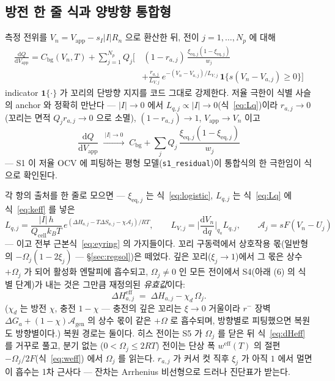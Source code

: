\documentclass[11pt,a4paper]{article}
\newcommand{\dd}{\mathrm{d}}
\newcommand{\eff}{\mathrm{eff}}
\newcommand{\eq}{\mathrm{eq}}
\newcommand{\app}{\mathrm{app}}
\newcommand{\cell}{\mathrm{cell}}
\newcommand{\bg}{\mathrm{bg}}
\begin{document}
\subsection{방전 한 줄 식과 양방향 통합형}
측정 전위를 $V_n=V_\app-s_I|I|R_n$ 으로 환산한 뒤, 전이 $j=1,\dots,N_p$ 에 대해
\begin{equation}
\boxed{\;\begin{aligned}\frac{\dd Q}{\dd V_\app}=C_\bg(V_n,T)+\sum_{j=1}^{N_p}Q_j\bigg[&\,
(1-r_{a,j})\,\frac{\xi_{\eq,j}(1-\xi_{\eq,j})}{w_j}\\[-2pt]
&+\frac{r_{a,j}}{L_{V,j}}\,e^{-(V_n-V_{a,j})/L_{V,j}}\,\mathbf 1\{s(V_n-V_{a,j})\ge0\}\bigg]\end{aligned}\;}
\label{eq:master}
\end{equation}
indicator $\mathbf 1\{\cdot\}$ 가 꼬리의 단방향 지지를 코드 그대로 강제한다. 저율 극한이 식별
사슬의 anchor 와 정확히 만난다 — $|I|\to0$ 에서 $L_{q,j}\propto|I|\to0$(식~\eqref{eq:Lq})이라
$r_{a,j}\to0$(꼬리는 면적 $Q_jr_{a,j}\to0$ 으로 소멸), $(1-r_{a,j})\to1$, $V_\app\to V_n$ 이고
\begin{equation*}
\frac{\dd Q}{\dd V_\app}\;\xrightarrow{\ |I|\to0\ }\;
C_\bg+\sum_jQ_j\,\frac{\xi_{\eq,j}(1-\xi_{\eq,j})}{w_j}
\end{equation*}
— S1 이 저율 OCV 에 피팅하는 평형 모델(\texttt{s1\_residual})이 통합식의 한 극한임이 식으로
확인된다.

각 항의 출처를 한 줄로 모으면 — $\xi_{\eq,j}$ 는 식~\eqref{eq:logistic}, $L_{q,j}$ 는
식~\eqref{eq:Lq} 에 식~\eqref{eq:keff} 를 넣은
\begin{equation*}
L_{q,j}=\frac{|I|\,h}{Q_\cell k_BT}\,
e^{(\Delta H_{a,j}-T\Delta S_{a,j}-\chi\mathcal A_j)/RT},
\qquad L_{V,j}=\Big|\frac{\dd V_n}{\dd q}\Big|_{q_a}L_{q,j},
\qquad \mathcal A_j=sF(V_n-U_j)
\end{equation*}
— 이고 전부 근본식~\eqref{eq:eyring} 의 가지들이다. 꼬리 구동력에서 상호작용 몫(일반형의 $-\Omega_j(1-2\xi_j)$ — \S\ref{sec:regsol})은 떼었다.
깊은 꼬리($\xi_j\to1$)에서 그 몫은 상수 $+\Omega_j$ 가 되어 활성화 엔탈피에 흡수되고,
$\Omega_j\ne0$ 인 모든 전이에서 S4(아래 (6) 의 식별 단계)가 내는 것은 그만큼 재정의된
\emph{유효값}이다:
\begin{equation}
\Delta H_{a,j}^{\eff}\;=\;\Delta H_{a,j}-\chi_d\,\Omega_j.
\label{eq:dHeff}
\end{equation}
($\chi_d$ 는 방전 $\chi$, 충전 $1-\chi$ — 충전의 깊은 꼬리는 $\xi\to0$ 거울이라 $r^-$ 장벽
$\Delta G_a+(1-\chi)\mathcal A_{\text{gen}}$ 의 상수 몫이 같은 $+\Omega$ 로 흡수되며, 방향별로
피팅했으면 복원도 방향별이다.) 복원 경로는
둘이다. 히스 전이는 S5 가 $\Omega_j$ 를 닫은 뒤 식~\eqref{eq:dHeff} 를 거꾸로 풀고, 분기 없는
($0<\Omega_j\le2RT$) 전이는 단상 폭 $w^{\eff}(T)$ 의 절편 $-\Omega_j/2F$(식~\eqref{eq:weff})
에서 $\Omega_j$ 를 읽는다. $r_{a,j}$ 가 커서 컷 직후 $\xi_j$ 가 아직 $1$ 에서 멀면 이 흡수는 1차 근사다 — 잔차는
Arrhenius 비선형으로 드러나 진단표가 받는다.
\end{document}
